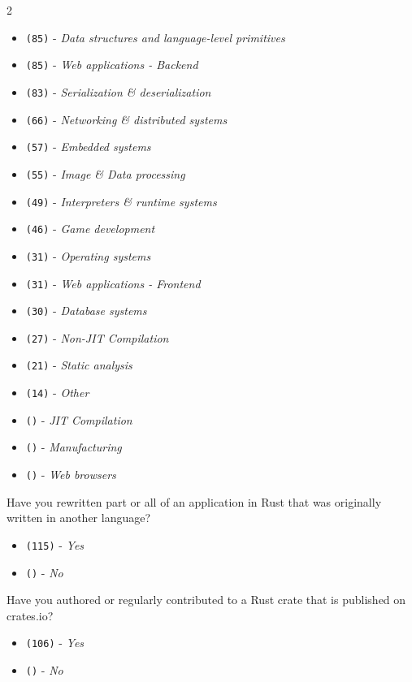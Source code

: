 \begin{protocol}
\begin{multicols}{2}
\begin{itemize}
\item \texttt{(85)} - \textit{Data structures and language-level primitives}
\item \texttt{(85)} - \textit{Web applications - Backend}
\item \texttt{(83)} - \textit{Serialization \& deserialization}
\item \texttt{(66)} - \textit{Networking \& distributed systems}
\item \texttt{(57)} - \textit{Embedded systems}
\item \texttt{(55)} - \textit{Image \& Data processing}
\item \texttt{(49)} - \textit{Interpreters \& runtime systems}
\item \texttt{(46)} - \textit{Game development}
\item \texttt{(31)} - \textit{Operating systems}
\item \texttt{(31)} - \textit{Web applications - Frontend}
\item \texttt{(30)} - \textit{Database systems}
\item \texttt{(27)} - \textit{Non-JIT Compilation}
\item \texttt{(21)} - \textit{Static analysis}
\item \texttt{(14)} - \textit{Other}
\item \texttt{()} - \textit{JIT Compilation}
\item \texttt{()} - \textit{Manufacturing}
\item \texttt{()} - \textit{Web browsers}
\end{itemize}
\end{multicols}
\item \label{survey:dmq3} Have you rewritten part or all of an application in Rust that was originally written in another language?
\begin{itemize}
\item \texttt{(115)} - \textit{Yes}
\item \texttt{()} - \textit{No}
\end{itemize}
\item \label{survey:dmq4} Have you authored or regularly contributed to a Rust crate that is published on crates.io?
\begin{itemize}
\item \texttt{(106)} - \textit{Yes}
\item \texttt{()} - \textit{No}
\end{itemize}

\end{protocol}
